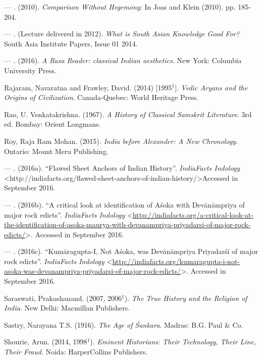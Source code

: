 \begin{thebibliography}{99}
  — . (2010). \textit{Comparison Without Hegemony}: In Joas and Klein (2010). pp. 185-204.

  — . (Lecture delivered in 2012). \textit{What is South Asian Knowledge Good For?} South Asia Institute Papers, Issue 01 2014.

  — . (2016). \textit{A Rasa Reader: classical Indian aesthetics.} New York: Columbia University Press.

  Rajaram, Navaratna and Frawley, David. (2014) [1995$^{1}$]. \textit{Vedic Aryans and the Origins of Civilization}. Canada-Quebec: World Heritage Press.

  Rao, U. Venkatakrishna. (1967). \textit{A History of Classical Samskrit Literature}. 3rd ed. Bombay: Orient Longmans.

  Roy, Raja Ram Mohan. (2015). \textit{India before Alexander: A New Chronology}. Ontario: Mount Meru Publishing.

  — . (2016a). “Flawed Sheet Anchors of Indian History”. \textit{IndiaFacts Indology} \textless http://indiafacts.org/flawed-sheet-anchors-of-indian-\break history/\textgreater  Accessed in September 2016.

  — . (2016b). “A critical look at identification of Aśoka with Devānāmpriya of major rock edicts”. \textit{IndiaFacts Indology} \textless \url{http://indiafacts.org/a-critical-look-at-the-identification-of-asoka-maurya-with-devanampriya-priyadarsi-of-major-rock-edicts/}\textgreater.  Accessed in September 2016.

  — . (2016c). “Kumāragupta-I, Not Aśoka, was Devānāmpriya Priyadarśī of major rock edicts”. \textit{IndiaFacts Indology} \textless \url{http://indiafacts.org/kumaragupta-i-not-asoka-was-devanampriya-priyadarsi-of-major-rock-edicts/}\textgreater.  Accessed in September 2016.

  Saraswati, Prakashanand. (2007, 2006$^{1}$). \textit{The True History and the Religion of India}. New Delhi: Macmillan Publishers.

  Sastry, Narayana T.S. (1916). \textit{The Age of Śankara}. Madras: B.G. Paul \& Co.

  Shourie, Arun. (2014, 1998$^{1}$). \textit{Eminent Historians: Their Technology, Their Line, Their Fraud}. Noida: HarperCollins Publishers.


\end{thebibliography}
